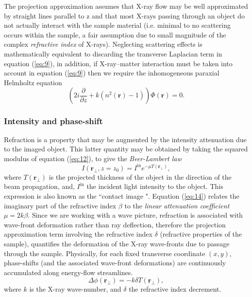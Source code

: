 \documentclass[10pt, a4paper, singlespacing]{report}
\begin{document}
The projection approximation assumes that X-ray flow may be well approximated by straight lines parallel to z\cite{PagsTutes} and that most X-rays passing through an object do not actually interact with the sample material (i.e. minimal to no scattering occurs within the sample, a fair assumption due to small magnitude of the complex \textit{refractive index} of X-rays). Neglecting scattering effects is mathematically equivalent to discarding the transverse Laplacian term in equation (\ref{eq:9})\cite{CH49}, in addition, if X-ray--matter interaction must be taken into account in equation (\ref{eq:9}) then we require the inhomogeneous paraxial Helmholtz equation
\begin{equation}\label{eq:13}
\left ( 2 i \frac{\partial }{\partial z} + k ( n^2 (\mathbf{r}) - 1 )\right ) \Phi(\mathbf{r}) = 0.
\end{equation}

\subsubsection{Intensity and phase-shift}\label{Intensity and phase}

Refraction is a property that may be augmented by the intensity attenuation due to the imaged object. This latter quantity may be obtained by taking the squared
modulus of equation (\ref{eq:12}), to give the \textit{Beer-Lambert law}\cite{PagsTutes}
\begin{equation}\label{eq:14}
I(\mathbf{r}_{\perp}, z = z_0) = I^{\mathrm{in}} e^{-\mu T(\mathbf{r}_{\perp})},
\end{equation}
where $T(\mathbf{r}_{\perp})$ is the projected thickness of the object in the direction of the beam propagation, and, $I^{\mathrm{in}}$ the incident light intensity to the object. This expression is also known as the ``contact image ". Equation (\ref{eq:14}) relates the imaginary part of the refractive index $\beta$ to the \textit{linear attenuation coefficient} $\mu = 2k\beta$. 
Since we are working with a wave picture, refraction is associated with wave-front deformation rather than ray deflection, therefore the projection approximation term involving the refractive index $\delta$ (refractive properties of the sample), quantifies the deformation of the X-ray wave-fronts due to passage through the sample. Physically, for each fixed transverse coordinate $(x, y)$, phase-shifts (and the associated wave-front deformations) are continuously accumulated along energy-flow streamlines\cite{PagsTutes}.
\begin{equation}\label{eq:15}
\Delta \phi(\mathbf{r}_{\perp}) = -k \delta T(\mathbf{r}_{\perp}),
\end{equation}
where $k$ is the X-ray wave-number, and $\delta$ the refractive index decrement.
\end{document}
